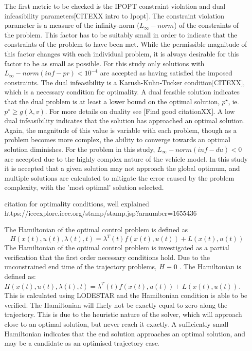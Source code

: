 The first metric to be checked is the IPOPT constraint violation and dual infeasibility parameters[CITEXX intro to Ipopt]. The constraint violation parameter is a measure of the infinity-norm ($L_\infty-norm$) of the constraints of the problem. This factor has to be suitably small in order to indicate that the constraints of the problem to have been met. While the permissible magnitude of this factor changes with each individual problem, it is always desirable for this factor to be as small as possible. For this study only solutions with $L_\infty-norm(inf-pr) < 10^{-4} $ are accepted as having satisfied the imposed constraints. The dual infeasibility is a Karush-Kuhn-Tucker condition[CITEXX], which is a necessary condition for optimality. A dual feasible solution indicates that the dual problem is at least a lower bound on the optimal solution, $p^\star$, ie. $p^\star \geq g(\lambda,v)$. For more details on duality see [Find good citationXX].
A low dual infeasibility indicates that the solution has approached an optimal solution. Again, the magnitude of this value is variable with each problem, though as a problem becomes more complex, the ability to converge towards an optimal solution diminishes. For the problem in this study, $L_\infty-norm(inf-du) < 0 $ are accepted due to the highly complex nature of the vehicle model. In this study it is accepted that a given solution may not approach the global optimum, and multiple solutions are calculated to mitigate the error caused by the problem complexity, with the 'most optimal' solution selected. 

citation for optimality conditions, well explained https://ieeexplore.ieee.org/stamp/stamp.jsp?arnumber=1655436

The Hamiltonian of the optimal control problem is defined as 
\begin{equation}
H(x(t),u(t),\lambda(t),t) = \lambda^T(t)f(x(t),u(t)) + L(x(t),u(t))
\end{equation}
The Hamiltonian of the optimal control problem is investigated as a partial verification that the first order necessary conditions hold. Due to the unconstrained end time of the trajectory problems, $H\equiv 0 $ \cite{Pucci2007}. The Hamiltonian is defined as: $H(x(t),u(t),\lambda(t),t) = \lambda^T(t)f(x(t),u(t))+L(x(t),u(t))$.
This is calculated using LODESTAR and the Hamiltonian condition is able to be verified. The Hamiltonian will likely not be exactly equal to zero along the trajectory. This is due to the heuristic nature of the solver, which will approach close to an optimal solution, but never reach it exactly. A sufficiently small Hamiltonian indicates that the end solution approaches an optimal solution, and may be a candidate as an optimised trajectory case. 


